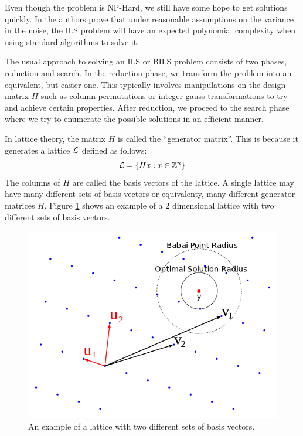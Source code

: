 \documentclass[12pt,Bold,letterpaper]{mcgilletdclass}
\begin{document}
Even though the problem is NP-Hard, we still have some hope to get solutions
quickly. In \cite{HasV05} the authors prove that under reasonable assumptions
on the variance in the noise, the ILS problem will have an expected polynomial complexity when using standard algorithms to solve it.

The usual approach to solving an ILS or BILS problem consists of two phases,
reduction and search. In the reduction phase, we transform the problem into an
equivalent, but easier one. This typically involves manipulations on the design matrix $H$ such as column permutations
or integer gauss transformations to try and achieve certain properties. After reduction, we proceed to the search phase where we try to enumerate the possible solutions in an efficient manner.

In lattice theory, the matrix $H$ is called the ``generator matrix''. This is because it generates a lattice $\cal{L}$ defined as follows:
\begin{equation}
{\cal{L}} = \{Hx: x\in \mathbb{Z}^n\}
\end{equation}
The columns of $H$ are called the basis vectors of the lattice. A single lattice may have many different sets of basis vectors or equivalenty, many different generator matrices $H$. Figure \ref{fig:latticeBasis} shows an example of a 2 dimensional lattice with two different sets of basis vectors.

\begin{figure}
\centering
\includegraphics[scale=0.4]{latticebasis.png}
\caption{An example of a lattice with two different sets of basis vectors.}
\label{fig:latticeBasis}
\end{figure}
\end{document}

